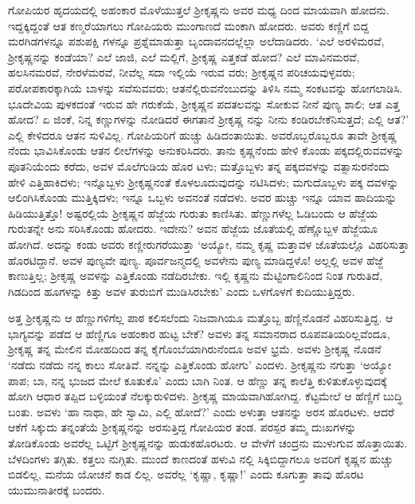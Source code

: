 ಗೋಪಿಯರ ಹೃದಯದಲ್ಲಿ ಅಹಂಕಾರ ಮೊಳೆಯುತ್ತಲೆ ಶ್ರೀಕೃಷ್ಣನು ಅವರ ಮಧ್ಯ ದಿಂದ ಮಾಯವಾಗಿ ಹೋದನು. ಇದ್ದಕ್ಕಿದ್ದಂತೆ ಆತ ಕಣ್ಮರೆಯಾಗಲು ಗೋಪಿಯರು ಮುಂಗಾಣದೆ ಮಂಕಾಗಿ ಹೋದರು. ಅವರು ಕಣ್ಣಿಗೆ ಬಿದ್ದ ಮರಗಿಡಗಳನ್ನೂ ಪಶುಪಕ್ಷಿ ಗಳನ್ನೂ ಪ್ರಶ್ನೆಮಾಡುತ್ತಾ ಬೃಂದಾವನದಲ್ಲೆಲ್ಲಾ ಅಲೆದಾಡಿದರು. ‘ಎಲೆ ಅರಳಿಮರವೆ, ಶ್ರೀಕೃಷ್ಣನನ್ನು ಕಂಡೆಯಾ? ಎಲೆ ಜಾಜಿ, ಎಲೆ ಮಲ್ಲಿಗೆ, ಶ್ರೀಕೃಷ್ಣ ಎತ್ತಕಡೆ ಹೋದ? ಎಲೆ ಮಾವಿನಮರವೆ, ಹಲಸಿನಮರವೆ, ನೇರಳೆಮರವೆ, ನೀವೆಲ್ಲ ಸದಾ ಇಲ್ಲಿಯೆ ಇರುವ ವರು; ಶ್ರೀಕೃಷ್ಣನ ಪರಿಚಯವುಳ್ಳವರು; ಪರೋಪಕಾರಕ್ಕಾಗಿಯೆ ಬಾಳನ್ನು ಸವೆಸುವವರು; ಆತನೆಲ್ಲಿರುವನೆಂಬುದನ್ನು ತಿಳಿಸಿ ನಮ್ಮ ಸಂಕಟವನ್ನು ಹೋಗಲಾಡಿಸಿ. ಭೂದೇವಿಯ ಪುಳಕದಂತೆ ಇರುವ ಹೇ ಗರುಕೆಯೆ, ಶ್ರೀಕೃಷ್ಣನ ಪದತಲವನ್ನು ಸೋಕುವ ನೀನೆ ಪುಣ್ಯ ಶಾಲಿ; ಆತ ಎತ್ತ ಹೋದ? ಏ ಜಿಂಕೆ, ನಿನ್ನ ಕಣ್ಣುಗಳನ್ನು ನೋಡಿದರೆ ಈಗತಾನೆ ಶ್ರೀಕೃಷ್ಣ ನನ್ನು ನೀನು ಕಂಡಿರಬೇಕೆನಿಸುತ್ತದೆ; ಎಲ್ಲಿ ಆತ?’ ಎಲ್ಲಿ ಕೇಳಿದರೂ ಆತನ ಸುಳಿವಿಲ್ಲ. ಗೋಪಿಯರಿಗೆ ಹುಚ್ಚು ಹಿಡಿದಂತಾಯಿತು. ಅವರೊಬ್ಬರೊಬ್ಬರೂ ತಾವೇ ಶ್ರೀಕೃಷ್ಣ ನೆಂದು ಭಾವಿಸಿಕೊಂಡು ಆತನ ಲೀಲೆಗಳನ್ನು ಅನುಕರಿಸಿದರು. ತಾನು ಕೃಷ್ಣನೆಂದು ಹೇಳಿ ಕೊಂಡು ಪಕ್ಕದಲ್ಲಿರುವವಳನ್ನು ಪೂತನಿಯೆಂದು ಕರೆದು, ಅವಳ ಮೊಲೆಗುಡಿಯ ಹೊರ ಟಳು; ಮತ್ತೊಬ್ಬಳು ತನ್ನ ಪಕ್ಕದವಳನ್ನು ವತ್ಸಾಸುರನೆಂದು ಹೇಳಿ ಎತ್ತಿಹಾಕಿದಳು; ಇನ್ನೊಬ್ಬಳು ಶ್ರೀಕೃಷ್ಣನಂತೆ ಕೊಳಲೂದುವುದನ್ನು ನಟಿಸಿದಳು; ಮಗುದೊಬ್ಬಳು ಪಕ್ಕ ದವಳನ್ನು ಆಲಿಂಗಿಸಿಕೊಂಡು ಮುತ್ತಿಕ್ಕಿದಳು; ಇನ್ನೂ ಒಬ್ಬಳು ಅವನಂತೆ ನಡೆದಳು. ಅವರ ಹುಚ್ಚು ಇನ್ನೂ ಯಾವ ಹಾದಿಯನ್ನು ಹಿಡಿಯುತ್ತಿತ್ತೊ! ಅಷ್ಟರಲ್ಲಿಯೆ ಶ್ರೀಕೃಷ್ಣನ ಹೆಜ್ಜೆಯ ಗುರುತು ಕಾಣಿಸಿತು. ಹೆಣ್ಣುಗಳೆಲ್ಲ ಓಡಿಬಂದು ಆ ಹೆಜ್ಜೆಯ ಗುರುತನ್ನೇ ಅನು ಸರಿಸಿಕೊಂಡು ಹೋದರು. ಇದೇನು? ಅವನ ಹೆಜ್ಜೆಯ ಜೊತೆಯಲ್ಲಿ ಹೆಣ್ಣೊಬ್ಬಳ ಹೆಜ್ಜೆಯೂ ಹೋಗಿದೆ. ಅದನ್ನು ಕಂಡು ಅವರು ಕಣ್ಣೀರುಗರೆಯುತ್ತಾ ‘ಅಯ್ಯೋ, ನಮ್ಮ ಕೃಷ್ಣ ಮತ್ತಾವಳ ಜೊತೆಯಲ್ಲೊ ವಿಹರಿಸುತ್ತಾ ಹೊರಟಿದ್ದಾನೆ. ಅವಳ ಪುಣ್ಯವೇ ಪುಣ್ಯ. ಪೂರ್ವಜನ್ಮದಲ್ಲಿ ಅವಳೇನು ಪುಣ್ಯ ಮಾಡಿದ್ದಳೊ! ಅಲ್ಲಲ್ಲಿ ಅವಳ ಹೆಜ್ಜೆ ಕಾಣುತ್ತಿಲ್ಲ; ಶ್ರೀಕೃಷ್ಣ ಅವಳನ್ನು ಎತ್ತಿಕೊಂಡು ನಡೆದಿರಬೇಕು. ಇಲ್ಲಿ ಕೃಷ್ಣನು ಮೆಟ್ಟಿಂಗಾಲಿನಿಂದ ನಿಂತ ಗುರುತಿದೆ, ಗಿಡದಿಂದ ಹೂಗಳನ್ನು ಕಿತ್ತು ಅವಳ ತುರುಬಿಗೆ ಮುಡಿಸಿರಬೇಕು’ ಎಂದು ಒಳಗೊಳಗೆ ಕುದಿಯುತ್ತಿದ್ದರು.

ಅತ್ತ ಶ್ರೀಕೃಷ್ಣನು ಆ ಹೆಣ್ಣುಗಳಿಗೆಲ್ಲ ಪಾಠ ಕಲಿಸಲೆಂದು ನಿಜವಾಗಿಯೂ ಮತ್ತೊಬ್ಬ ಹೆಣ್ಣಿನೊಡನೆ ವಿಹರಿಸುತ್ತಿದ್ದ. ಆ ಭಾಗ್ಯವನ್ನು ಪಡೆದ ಆ ಹೆಣ್ಣಿಗೂ ಅಹಂಕಾರ ಹುಟ್ಟ ಬೇಕೆ? ಅವಳು ತನ್ನ ಸಮಾನರಾದ ರೂಪವತಿಯರಿಲ್ಲವೆಂದೂ, ಶ್ರೀಕೃಷ್ಣ ತನ್ನ ಮೇಲಿನ ಮೋಹದಿಂದ ತನ್ನ ಕೈಗೊಂಬೆಯಾಗಿರುನೆಂದೂ ಅವಳ ಭ್ರಮೆ. ಅವಳು ಶ್ರೀಕೃಷ್ಣ ನೊಡನೆ ‘ನಡೆದು ನಡೆದು ನನ್ನ ಕಾಲು ಸೋತಿವೆ. ನನ್ನನ್ನು ಎತ್ತಿಕೊಂಡು ಹೋಗು’ ಎಂದಳು. ಶ್ರೀಕೃಷ್ಣನು ನಗುತ್ತಾ ‘ಅಯ್ಯೋ ಪಾಪ; ಬಾ, ನನ್ನ ಭುಜದ ಮೇಲೆ ಕೂತುಕೊ’ ಎಂದು ಬಾಗಿ ನಿಂತ. ಆ ಹೆಣ್ಣು ತನ್ನ ಕಾಲೆತ್ತಿ ಕುಳಿತುಕೊಳ್ಳುವುದಕ್ಕೆ ಹೋಗಿ ಆಧಾರ ತಪ್ಪಿದ ಬಳ್ಳಿಯಂತೆ ನೆಲಕ್ಕುರುಳಿದಳು. ಶ್ರೀಕೃಷ್ಣ ಮಾಯವಾಗಿಹೋಗಿದ್ದ. ಕೆಟ್ಟಮೇಲೆ ಆ ಹೆಣ್ಣಿಗೆ ಬುದ್ಧಿ ಬಂತು. ಅವಳು ‘ಹಾ ನಾಥಾ, ಹೇ ಸ್ವಾಮಿ, ಎಲ್ಲಿ ಹೋದೆ?’ ಎಂದು ಅಳುತ್ತಾ ಆತನನ್ನು ಅರಸ ಹೊರಟಳು. ಆದರೆ ಆಕೆಗೆ ಸಿಕ್ಕುದು ತನ್ನಂತೆಯೆ ಶ್ರೀಕೃಷ್ಣನನ್ನು ಅರಸುತ್ತಿದ್ದ ಗೋಪಿಯರ ತಂಡ. ಪರಸ್ಪರ ತಮ್ಮ ದುಃಖಗಳನ್ನು ತೋಡಿಕೊಂಡು ಅವರೆಲ್ಲ ಒಟ್ಟಿಗೆ ಶ್ರೀಕೃಷ್ಣನನ್ನು ಹುಡುಕಹೊರಟರು. ಆ ವೇಳೆಗೆ ಚಂದ್ರನು ಮುಳುಗುವ ಹೊತ್ತಾಯಿತು. ಬೆಳದಿಂಗಳು ತಗ್ಗಿತು. ಕತ್ತಲು ನುಗ್ಗಿತು. ಮುಂದೆ ಕಾಣದಂತೆ ಹಳುವಿ ನಲ್ಲಿ ಸಿಕ್ಕಿಬಿದ್ದಾಗಲೂ ಅವರಿಗೆ ಕೃಷ್ಣನ ಹುಚ್ಚು ಬಿಡಲಿಲ್ಲ, ಮನೆಯ ಯೋಚನೆ ಕಾಡ ಲಿಲ್ಲ. ಅವರೆಲ್ಲ ‘ಕೃಷ್ಣಾ, ಕೃಷ್ಣಾ!’ ಎಂದು ಕೂಗುತ್ತಾ ತಾವು ಹೊರಟ ಯುಮುನಾತೀರಕ್ಕೆ ಬಂದರು.

